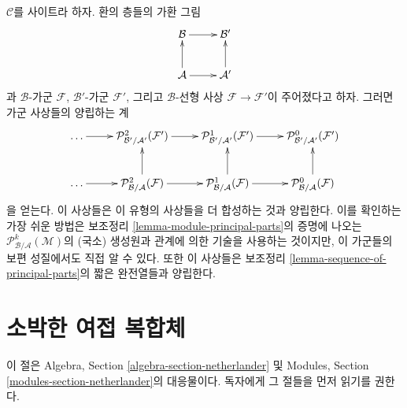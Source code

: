 \begin{remark}
\label{remark-functoriality-principal-parts}
$\mathcal{C}$를 사이트라 하자. 환의 층들의 가환 그림
$$
\xymatrix{
\mathcal{B} \ar[r] & \mathcal{B}' \\
\mathcal{A} \ar[u] \ar[r] & \mathcal{A}' \ar[u]
}
$$
과 $\mathcal{B}$-가군 $\mathcal{F}$, $\mathcal{B}'$-가군
$\mathcal{F}'$, 그리고 $\mathcal{B}$-선형 사상
$\mathcal{F} \to \mathcal{F}'$이 주어졌다고 하자.
그러면 가군 사상들의 양립하는 계
$$
\xymatrix{
\ldots \ar[r] &
\mathcal{P}^2_{\mathcal{B}'/\mathcal{A}'}(\mathcal{F}') \ar[r] &
\mathcal{P}^1_{\mathcal{B}'/\mathcal{A}'}(\mathcal{F}') \ar[r] &
\mathcal{P}^0_{\mathcal{B}'/\mathcal{A}'}(\mathcal{F}') \\
\ldots \ar[r] &
\mathcal{P}^2_{\mathcal{B}/\mathcal{A}}(\mathcal{F}) \ar[r] \ar[u] &
\mathcal{P}^1_{\mathcal{B}/\mathcal{A}}(\mathcal{F}) \ar[r] \ar[u] &
\mathcal{P}^0_{\mathcal{B}/\mathcal{A}}(\mathcal{F}) \ar[u]
}
$$
을 얻는다. 이 사상들은 이 유형의 사상들을 더 합성하는 것과 양립한다.
이를 확인하는 가장 쉬운 방법은 보조정리
\ref{lemma-module-principal-parts}의 증명에 나오는
$\mathcal{P}^k_{\mathcal{B}/\mathcal{A}}(\mathcal{M})$의 (국소) 생성원과
관계에 의한 기술을 사용하는 것이지만, 이 가군들의 보편 성질에서도
직접 알 수 있다. 또한 이 사상들은 보조정리
\ref{lemma-sequence-of-principal-parts}의 짧은 완전열들과 양립한다.
\end{remark}








\section{소박한 여접 복합체}
\label{section-netherlander}

\noindent
이 절은 Algebra, Section \ref{algebra-section-netherlander} 및
Modules, Section \ref{modules-section-netherlander}의 대응물이다.
독자에게 그 절들을 먼저 읽기를 권한다.

